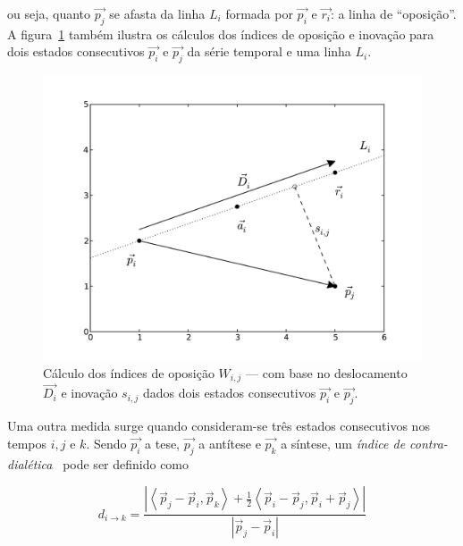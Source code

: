 \noindent ou seja, quanto $\vec{p_j}$ se afasta da linha $L_i$ formada por $\vec{p_i}$ e
$\vec{r_i}$: a linha de ``oposição''.  A
figura~\ref{fig:desc_opos_inov} também ilustra os cálculos dos índices
de oposição e inovação para dois estados consecutivos $\vec{p_i}$ e
$\vec{p_j}$ da série temporal e uma linha $L_i$.

\begin{figure}[ht!]
\begin{center}
              \caption{Cálculo dos índices de oposição $W_{i,j}$ --- com base
        no deslocamento $\vec{D_i}$ e inovação $s_{i,j}$ dados dois
        estados consecutivos $\vec{p_i}$ e $\vec{p_j}$.}
        \label{fig:desc_opos_inov}
        \includegraphics[scale=.6]{figs/desc_opos.pdf}
        \fonteminha
\end{center}
\end{figure}

Uma outra medida surge quando consideram-se três estados consecutivos
nos tempos $i, j$ e $k$. Sendo $\vec{p_i}$ a tese, $\vec{p_j}$ a
antítese e $\vec{p_k}$ a síntese, um \emph{índice de
  contra-dialética}~\cite{vieira} pode ser definido como


\begin{equation}
d_{i \rightarrow k} = 
      \frac{|\left< \vec{p}_j-\vec{p}_i,\vec{p}_k \right> + 
        \frac{1}{2}\left<\vec{p}_i-\vec{p}_j, \vec{p}_i+\vec{p}_j\right>|}
           {|\vec{p}_j-\vec{p}_i|}
\end{equation}

